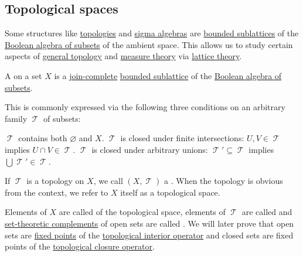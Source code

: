 \subsection{Topological spaces}\label{subsec:topological_spaces}

\begin{remark}\label{rem:topologies_and_sigma_algebras_as_lattices}
  Some structures like \hyperref[def:topological_space]{topologies} and \hyperref[def:sigma_algebra]{sigma algebras} are \hyperref[def:semilattice/submodel]{bounded sublattices} of the \hyperref[thm:boolean_algebra_of_subsets]{Boolean algebra of subsets} of the ambient space. This allows us to study certain aspects of \hyperref[sec:general_topology]{general topology} and \hyperref[sec:measure_theory]{measure theory} via \hyperref[subsec:lattices]{lattice theory}.
\end{remark}

\begin{definition}\label{def:topological_space}
  A  on a set \( X \) is a \hyperref[def:semilattice/lattice]{join-complete} \hyperref[def:semilattice/submodel]{bounded sublattice} of the \hyperref[thm:boolean_algebra_of_subsets]{Boolean algebra of subsets}.

  This is commonly expressed via the following three conditions on an arbitrary family \( \mscrT \) of subsets:
  \begin{thmenum}
     \( \mscrT \) contains both \( \varnothing \) and \( X \).
     \( \mscrT \) is closed under finite intersections: \( U, V \in \mscrT \) implies \( U \cap V \in \mscrT \).
     \( \mscrT \) is closed under arbitrary unions: \( \mscrT' \subseteq \mscrT \) implies \( \bigcup \mscrT' \in \mscrT \).
  \end{thmenum}

  If \( \mscrT \) is a topology on \( X \), we call \( (X, \mscrT) \) a . When the topology is obvious from the context, we refer to \( X \) itself as a topological space.

  Elements of \( X \) are called  of the topological space, elements of \( \mscrT \) are called  and \hyperref[thm:boolean_algebra_of_subsets/complement]{set-theoretic complements} of open sets are called . We will later prove that open sets are \hyperref[def:fixed_point]{fixed points} of the \hyperref[def:topological_interior_operator]{topological interior operator} and closed sets are fixed points of the \hyperref[def:topological_closure_operator]{topological closure operator}.
\end{definition}

